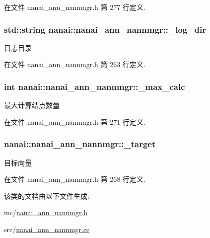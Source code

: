 在文件 nanai\+\_\+ann\+\_\+nannmgr.\+h 第 277 行定义.

\hypertarget{classnanai_1_1nanai__ann__nannmgr_a7d3908d8d93cc40191ec8f20f4808ba0}{}
\subsubsection[{\+\_\+log\+\_\+dir}]{\setlength{\rightskip}{0pt plus 5cm}std\+::string nanai\+::nanai\+\_\+ann\+\_\+nannmgr\+::\+\_\+log\+\_\+dir\hspace{0.3cm}{\ttfamily [protected]}}\label{classnanai_1_1nanai__ann__nannmgr_a7d3908d8d93cc40191ec8f20f4808ba0}
日志目录 

在文件 nanai\+\_\+ann\+\_\+nannmgr.\+h 第 263 行定义.

\hypertarget{classnanai_1_1nanai__ann__nannmgr_a7133133957796b1b5b75e8d761b54866}{}
\subsubsection[{\+\_\+max\+\_\+calc}]{\setlength{\rightskip}{0pt plus 5cm}int nanai\+::nanai\+\_\+ann\+\_\+nannmgr\+::\+\_\+max\+\_\+calc\hspace{0.3cm}{\ttfamily [protected]}}\label{classnanai_1_1nanai__ann__nannmgr_a7133133957796b1b5b75e8d761b54866}
最大计算结点数量 

在文件 nanai\+\_\+ann\+\_\+nannmgr.\+h 第 271 行定义.

\hypertarget{classnanai_1_1nanai__ann__nannmgr_a384127c4c4058bc4b28bdf928d59588a}{}
\subsubsection[{\+\_\+target}]{ nanai\+::nanai\+\_\+ann\+\_\+nannmgr\+::\+\_\+target\hspace{0.3cm}{\ttfamily [protected]}}\label{classnanai_1_1nanai__ann__nannmgr_a384127c4c4058bc4b28bdf928d59588a}
目标向量 

在文件 nanai\+\_\+ann\+\_\+nannmgr.\+h 第 268 行定义.



该类的文档由以下文件生成\+:\begin{DoxyCompactItemize}
\item 
inc/\hyperlink{nanai__ann__nannmgr_8h}{nanai\+\_\+ann\+\_\+nannmgr.\+h}\item 
src/\hyperlink{nanai__ann__nannmgr_8cc}{nanai\+\_\+ann\+\_\+nannmgr.\+cc}\end{DoxyCompactItemize}
